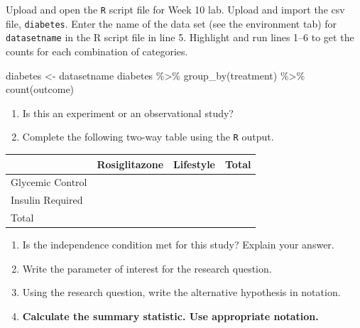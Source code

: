 \documentclass[
]{report}
\newenvironment{Shaded}{\begin{snugshade}}{\end{snugshade}}
\newcommand{\FunctionTok}[1]{\textcolor[rgb]{0.00,0.00,0.00}{#1}}
\newcommand{\NormalTok}[1]{#1}
\newcommand{\OtherTok}[1]{\textcolor[rgb]{0.56,0.35,0.01}{#1}}
\newcommand{\SpecialCharTok}[1]{\textcolor[rgb]{0.00,0.00,0.00}{#1}}
\begin{document}
Upload and open the \texttt{R} script file for Week 10 lab. Upload and import the csv file, \texttt{diabetes}. Enter the name of the data set (see the environment tab) for \texttt{datasetname} in the R script file in line 5. Highlight and run lines 1--6 to get the counts for each combination of categories.

\begin{Shaded}
\begin{Highlighting}[]
\NormalTok{diabetes }\OtherTok{\textless{}{-}}\NormalTok{ datasetname}
\NormalTok{diabetes }\SpecialCharTok{\%\textgreater{}\%} \FunctionTok{group\_by}\NormalTok{(treatment) }\SpecialCharTok{\%\textgreater{}\%} \FunctionTok{count}\NormalTok{(outcome)}
\end{Highlighting}
\end{Shaded}

\begin{enumerate}
\def\labelenumi{\arabic{enumi}.}
\item
  Is this an experiment or an observational study?
  \vspace{0.2in}
\item
  Complete the following two-way table using the \texttt{R} output.
\end{enumerate}

\begin{longtable}[]{@{}llll@{}}
\toprule
& Rosiglitazone & Lifestyle & Total \\
\midrule
\endhead
Glycemic Control & & & \\
Insulin Required & & & \\
Total & & & \\
\bottomrule
\end{longtable}

\begin{enumerate}
\def\labelenumi{\arabic{enumi}.}
\setcounter{enumi}{2}
\item
  Is the independence condition met for this study? Explain your answer.
  \vspace{0.6in}
\item
  Write the parameter of interest for the research question.
  \vspace{0.6in}
\item
  Using the research question, write the alternative hypothesis in notation.
  \vspace{0.3in}
\item
  \textbf{Calculate the summary statistic. Use appropriate notation.}
  \vspace{0.3in}
\end{enumerate}
\end{document}
